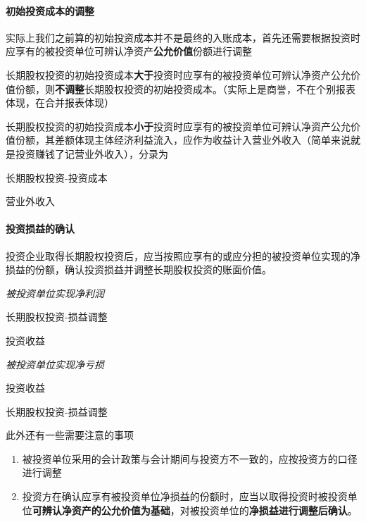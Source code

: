 \documentclass[UTF8,12pt]{ctexart}
\newenvironment{Dr}{%
	\begin{list}{}%
		{
			\setlength{\leftmargin}{2em}
			\setlength{\labelwidth}{2em}
			\setlength{\labelsep}{0pt}
			\setlength{\itemindent}{0pt}
			\setlength{\listparindent}{0pt}
			\setlength{\parsep}{0pt}
			\setlength{\topsep}{0pt}
		}
		\item[\textbf{借：}]
	}{%
	\end{list}
}
\newenvironment{Cr}{%
	\begin{list}{}%
		{
			\setlength{\leftmargin}{3em}
			\setlength{\labelwidth}{2em}
			\setlength{\labelsep}{0pt}
			\setlength{\itemindent}{0pt}
			\setlength{\listparindent}{0pt}
			\setlength{\parsep}{0pt}
			\setlength{\topsep}{0pt}
		}
		\item[\textbf{贷：}]
	}{%
	\end{list}
}
\numberwithin{equation}{section} %
\numberwithin{figure}{section}
\numberwithin{table}{section}
\begin{document}
	
	
	
	\paragraph{初始投资成本的调整}
	实际上我们之前算的初始投资成本并不是最终的入账成本，首先还需要根据投资时应享有的被投资单位可辨认净资产\textbf{公允价值}份额进行调整
	
	长期股权投资的初始投资成本\textbf{大于}投资时应享有的被投资单位可辨认净资产公允价值份额，则\textbf{不调整}长期股权投资的初始投资成本。（实际上是商誉，不在个别报表体现，在合并报表体现）
	
	长期股权投资的初始投资成本\textbf{小于}投资时应享有的被投资单位可辨认净资产公允价值份额，其差额体现主体经济利益流入，应作为收益计入营业外收入（简单来说就是投资赚钱了记营业外收入），分录为
	
	\begin{Dr}
		长期股权投资-投资成本
	\end{Dr}
	\begin{Cr}
		营业外收入
	\end{Cr}
	
	
	
	\paragraph{投资损益的确认}
	投资企业取得长期股权投资后，应当按照应享有的或应分担的被投资单位实现的净损益的份额，确认投资损益并调整长期股权投资的账面价值。
	
	\textit{被投资单位实现净利润}
	
	\begin{Dr}
		长期股权投资-损益调整
	\end{Dr}
	\begin{Cr}
		投资收益
	\end{Cr}
	
	\textit{被投资单位实现净亏损}
	
	\begin{Dr}
		投资收益
	\end{Dr}
	\begin{Cr}
		长期股权投资-损益调整
	\end{Cr}
	
	此外还有一些需要注意的事项
	\begin{enumerate}
		\item 被投资单位采用的会计政策与会计期间与投资方不一致的，应按投资方的口径进行调整
		
		\item 投资方在确认应享有被投资单位净损益的份额时，应当以取得投资时被投资单位\textbf{可辨认净资产的公允价值为基础}，对被投资单位的\textbf{净损益进行调整后确认}。
	\end{enumerate}
	
\end{document}
